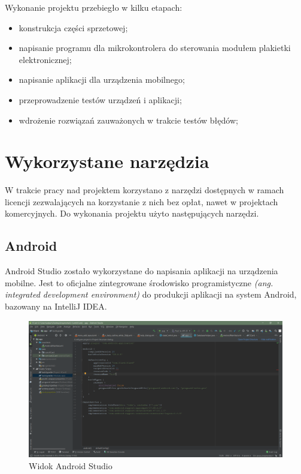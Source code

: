 \documentclass[a4paper,12pt, twoside]{article}
\begin{document}
	
    	\begin{flushleft}
    	Wykonanie projektu przebiegło w kilku etapach:
    	\begin{itemize}
    	    \item konstrukcja części sprzetowej;
    	    \item napisanie programu dla mikrokontrolera do sterowania modułem plakietki elektronicznej;
    	    \item napisanie aplikacji dla urządzenia mobilnego;
    	    \item przeprowadzenie testów urządzeń i aplikacji;
    	    \item wdrożenie rozwiązań zauważonych w trakcie testów błędów;
    	\end{itemize}
    	\end{flushleft}
 
    	\section{Wykorzystane narzędzia}
    	W trakcie pracy nad projektem korzystano z narzędzi dostępnych w ramach licencji zezwalających na korzystanie z nich bez opłat, nawet w projektach komercyjnych. Do wykonania projektu użyto następujących narzędzi.
    	
    	\subsection{Android}
    	Android Studio zostało wykorzystane do napisania aplikacji na urządzenia mobilne. Jest to oficjalne zintegrowane środowisko programistyczne \textit{(ang. integrated development environment)} \cite{ide} do produkcji aplikacji na system Android, bazowany na IntelliJ IDEA.
    	
    	\begin{figure}[H]
    	    \centering
    		\includegraphics[width=1\textwidth]{images/rys4_android.png}
    		\caption{Widok Android Studio}
            \label{fig:androidstudio}
    	\end{figure}
     	
\end{document}
